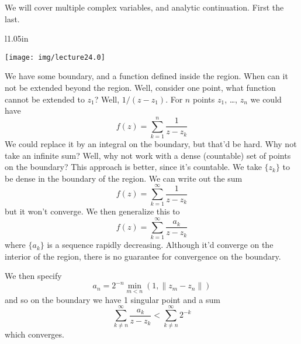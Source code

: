 We will cover multiple complex variables, and analytic
continuation. First the last.

\begin{wrapfigure}{l}{1.05in}
\vspace{-20pt}
\begin{center}
 \texttt{[image: img/lecture24.0]}
\end{center}
\vspace{-20pt}
\end{wrapfigure}
We have some boundary, and a function defined inside the
region. When can it not be extended beyond the region. Well,
consider one point, what function cannot be extended to $z_{1}$?
Well, $1/(z-z_{1})$. For $n$ points $z_{1}$, \dots, $z_{n}$ we
could have
\begin{equation}
f(z)=\sum_{k=1}^{n}\frac{1}{z-z_{k}}
\end{equation}
We could replace it by an integral on the boundary, but that'd be
hard. Why not take an infinite sum? Well, why not work with a
dense (countable) set of points on the boundary? This approach is
better, since it's countable. We take $\{z_{k}\}$ to be dense in
the boundary of the region. We can write out the sum
\begin{equation}
f(z)=\sum^{\infty}_{k=1}\frac{1}{z-z_{k}}
\end{equation}
but it won't converge. We then generalize this to
\begin{equation}
f(z)=\sum^{\infty}_{k=1}\frac{a_{k}}{z-z_{k}}
\end{equation}
where $\{a_{k}\}$ is a sequence rapidly decreasing. Although it'd
converge on the interior of the region, there is no guarantee for
convergence on the boundary.

We then specify
\begin{equation}
a_{n}=2^{-n}\min_{m<n}(1,\|z_{m}-z_{n}\|)
\end{equation}
and so on the boundary we have 1 singular point and a sum
\begin{equation}
\sum^{\infty}_{k\not=n}\frac{a_{k}}{z-z_{k}}<\sum^{\infty}_{k\not=n}2^{-k}
\end{equation}
which converges.
